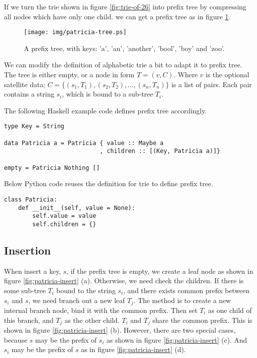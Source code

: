 \documentclass{article}
\begin{document}
If we turn the trie shown in figure \ref{fig:trie-of-26} into prefix tree
by compressing all nodes which have only one child. we can get
a prefix tree as in figure \ref{fig:patricia-tree}.

\begin{figure}[htbp]
  \centering
  \texttt{[image: img/patricia-tree.ps]}
  \caption{A prefix tree, with keys: 'a', 'an', 'another', 'bool',
    'boy' and 'zoo'.}
  \label{fig:patricia-tree}
\end{figure}

We can modify the definition of alphabetic trie a bit to adapt it
to prefix tree. The tree is either empty, or a node in form $T = (v, C)$.
Where $v$ is the optional satellite data; $C = \{(s_1, T_1), (s_2, T_2), ..., (s_n, T_n)\}$
is a list of pairs. Each pair contains a string $s_i$, which is bound
to a sub-tree $T_i$.

The following Haskell example code defines prefix tree accordingly.

\lstset{language=Haskell}
\begin{lstlisting}
type Key = String

data Patricia a = Patricia { value :: Maybe a
                           , children :: [(Key, Patricia a)]}

empty = Patricia Nothing []
\end{lstlisting}

Below Python code reuses the definition for trie to define prefix tree.

\lstset{language=Python}
\begin{lstlisting}
class Patricia:
    def __init__(self, value = None):
        self.value = value
        self.children = {}
\end{lstlisting}

\subsection{Insertion}

When insert a key, $s$, if the prefix tree is empty, we
create a leaf node as shown in figure \ref{fig:patricia-insert} (a).
Otherwise, we need check the children.
If there is some sub-tree $T_i$ bound to the string $s_i$,
and there exists common prefix between $s_i$ and $s$, we
need branch out a new leaf $T_j$. The method is to
create a new internal branch node, bind it with the common
prefix. Then set $T_i$ as one child of this branch, and
$T_j$ as the other child. $T_i$ and $T_j$ share the common
prefix. This is shown in figure \ref{fig:patricia-insert} (b).
However, there are two special cases, because $s$ may be the prefix of $s_i$
as shown in figure \ref{fig:patricia-insert} (c). And
$s_i$ may be the prefix of $s$ as in figure \ref{fig:patricia-insert} (d).
\end{document}
